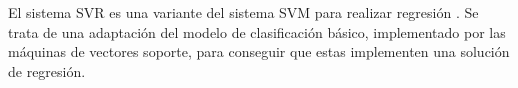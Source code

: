 El sistema \ac{SVR} es una variante del sistema \ac{SVM} para realizar regresión \cite{SVR}. Se trata de una adaptación del modelo de clasificación básico, implementado por las máquinas de vectores soporte, para conseguir que estas implementen una solución de regresión.



